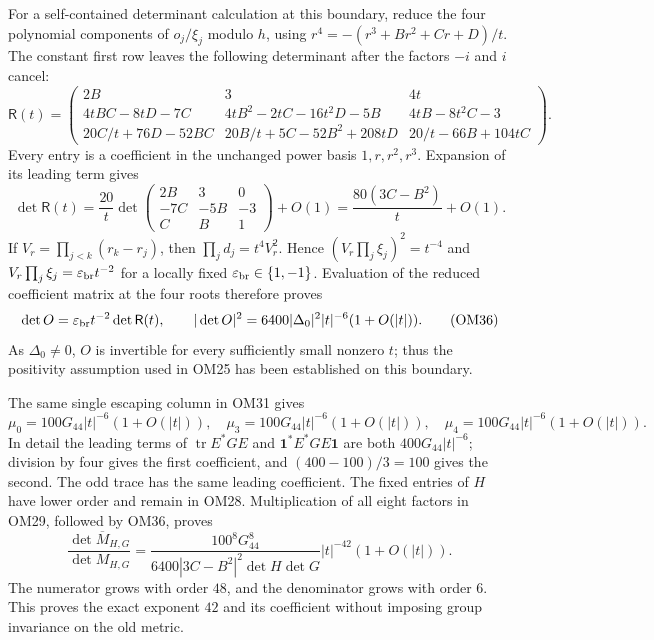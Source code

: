 \documentclass[11pt]{article}
\newcommand{\C}{\mathbb C}
\newcommand{\tr}{\operatorname{tr}}
\newcommand{\eps}{\varepsilon}
\newcommand{\one}{\mathbf 1}
\begin{document}
For a self-contained determinant calculation at this boundary,
reduce the four polynomial components of $o_j/\xi_j$ modulo
$h$, using $r^4=-(r^3+Br^2+Cr+D)/t$.
The constant first row leaves the following determinant after
the factors $-i$ and $i$ cancel:
\[
\mathsf R(t)=\begin{pmatrix}
2B&3&4t\\
4tBC-8tD-7C&4tB^2-2tC-16t^2D-5B&4tB-8t^2C-3\\
20C/t+76D-52BC&20B/t+5C-52B^2+208tD&20/t-66B+104tC
\end{pmatrix}.
\tag{OM34}
\]
Every entry is a coefficient in the unchanged power basis
$1,r,r^2,r^3$.  Expansion of its leading term gives
\[
\det\mathsf R(t)
=\frac{20}{t}
\det\begin{pmatrix}2B&3&0\\-7C&-5B&-3\\C&B&1\end{pmatrix}
 +O(1)
=\frac{80(3C-B^2)}t+O(1).
\tag{OM35}
\]
If $V_r=\prod_{j<k}(r_k-r_j)$, then
$\prod_jd_j=t^4V_r^2$.  Hence
$(V_r\prod_j\xi_j)^2=t^{-4}$ and
$V_r\prod_j\xi_j=\eps_{\rm br}t^{-2}$ for a locally fixed
$\eps_{\rm br}\in\{1,-1\}$.  Evaluation of the reduced
coefficient matrix at the four roots therefore proves
\[
\det O=\eps_{\rm br}t^{-2}\det\mathsf R(t),\qquad
|\det O|^2=6400|\Delta_0|^2|t|^{-6}(1+O(|t|)).
\tag{OM36}
\]
As $\Delta_0\ne0$, $O$ is invertible for every sufficiently small
nonzero $t$; thus the positivity assumption used in OM25 has
been established on this boundary.

The same single escaping column in OM31 gives
\[
\mu_0=100G_{44}|t|^{-6}(1+O(|t|)),\quad
\mu_3=100G_{44}|t|^{-6}(1+O(|t|)),\quad
\mu_4=100G_{44}|t|^{-6}(1+O(|t|)).
\tag{OM37}
\]
In detail the leading terms of $\tr E^*GE$ and
$\one^*E^*GE\one$ are both $400G_{44}|t|^{-6}$;
division by four gives the first coefficient, and
$(400-100)/3=100$ gives the second.
The odd trace has the same leading coefficient.  The fixed
entries of $H$ have lower order and remain in OM28.
Multiplication of all eight factors in OM29, followed by OM36,
proves
\[
\boxed{\frac{\det\overline M_{H,G}}{\det M_{H,G}}
=\frac{100^8G_{44}^8}
 {6400|3C-B^2|^2\det H\det G}
 |t|^{-42}(1+O(|t|)).}
\tag{OM38}
\]
The numerator grows with order $48$, and the denominator grows
with order $6$.  This proves the exact exponent $42$ and its
coefficient without imposing group invariance on the old metric.
\end{document}
